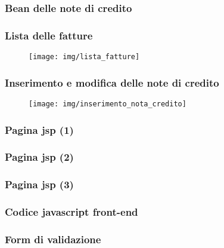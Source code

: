 \documentclass[]{beamer}
\begin{document}
    \begin{frame}
        \frametitle{Bean delle note di credito}
        
    \end{frame}

    \begin{frame}
        \frametitle{Lista delle fatture}
        \begin{figure}[H]
            \centering
            \texttt{[image: img/lista\_fatture]}\label{img:lista_fatture}
        \end{figure}
    \end{frame}

    \begin{frame}
        \frametitle{Inserimento e modifica delle note di credito}
        \begin{figure}[H]
            \centering
            \texttt{[image: img/inserimento\_nota\_credito]}\label{fig:insert}
        \end{figure}
    \end{frame}


    \begin{frame}
        \frametitle{Pagina jsp (1)}
        
    \end{frame}

    \begin{frame}
        \frametitle{Pagina jsp (2)}
        
    \end{frame}

    \begin{frame}
        \frametitle{Pagina jsp (3)}
        
    \end{frame}

    \begin{frame}
        \frametitle{Codice javascript front-end}
        
    \end{frame}

    \begin{frame}
        \frametitle{Form di validazione}
        
    \end{frame}
\end{document}
